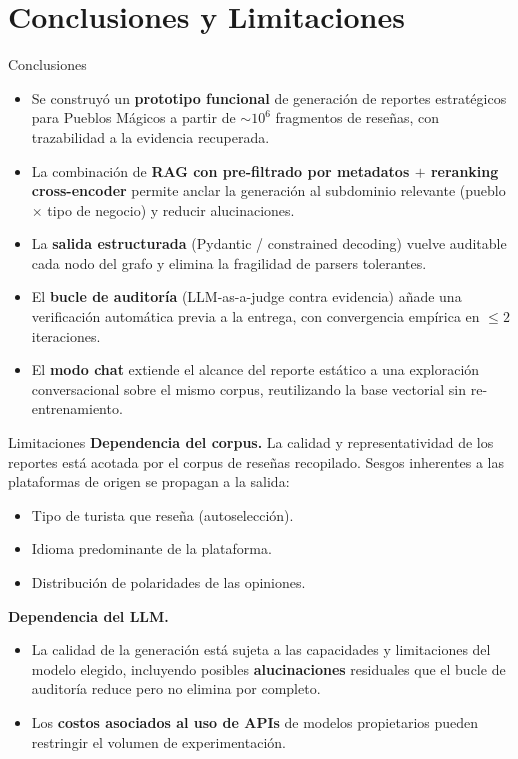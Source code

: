\documentclass[10pt,aspectratio=169]{beamer}
\begin{document}
\section{Conclusiones y Limitaciones}

\begin{frame}{Conclusiones}
	\begin{itemize}\setlength\itemsep{4pt}
		\item Se construyó un \textbf{prototipo funcional} de generación de
		      reportes estratégicos para Pueblos Mágicos a partir de
		      $\sim 10^6$ fragmentos de reseñas, con trazabilidad a la
		      evidencia recuperada.
		\item La combinación de \textbf{RAG con pre-filtrado por metadatos $+$
			      reranking cross-encoder} permite anclar la generación al subdominio
		      relevante (pueblo $\times$ tipo de negocio) y reducir alucinaciones.
		\item La \textbf{salida estructurada} (Pydantic / constrained decoding)
		      vuelve auditable cada nodo del grafo y elimina la fragilidad de
		      parsers tolerantes.
		\item El \textbf{bucle de auditoría} (LLM-as-a-judge contra evidencia)
		      añade una verificación automática previa a la entrega, con
		      convergencia empírica en $\le 2$ iteraciones.
		\item El \textbf{modo chat} extiende el alcance del reporte estático a
		      una exploración conversacional sobre el mismo corpus,
		      reutilizando la base vectorial sin re-entrenamiento.
	\end{itemize}
\end{frame}

\begin{frame}{Limitaciones}
	\textbf{Dependencia del corpus.} La calidad y representatividad de
	los reportes está acotada por el corpus de reseñas recopilado.
	Sesgos inherentes a las plataformas de origen se propagan a la salida:
	\begin{itemize}\setlength\itemsep{2pt}
		\item Tipo de turista que reseña (autoselección).
		\item Idioma predominante de la plataforma.
		\item Distribución de polaridades de las opiniones.
	\end{itemize}

	\medskip
	\textbf{Dependencia del LLM.}
	\begin{itemize}\setlength\itemsep{2pt}
		\item La calidad de la generación está sujeta a las capacidades y
		      limitaciones del modelo elegido, incluyendo posibles
		      \textbf{alucinaciones} residuales que el bucle de auditoría
		      reduce pero no elimina por completo.
		\item Los \textbf{costos asociados al uso de APIs} de modelos
		      propietarios pueden restringir el volumen de
		      experimentación.
	\end{itemize}
\end{frame}
\end{document}
